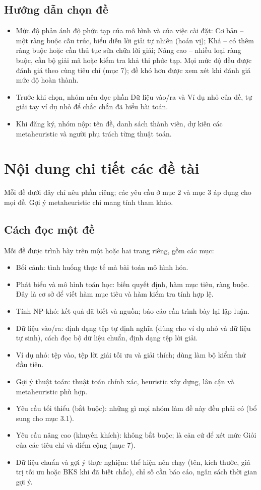 \documentclass[a4paper,11pt]{article}
\begin{document}
\subsection{Hướng dẫn chọn đề}
\begin{itemize}
\item Mức độ phản ánh độ phức tạp của mô hình và của việc cài đặt: Cơ bản – một ràng buộc cấu trúc, biểu diễn lời giải tự nhiên (hoán vị); Khá – có thêm ràng buộc hoặc cần thủ tục sửa chữa lời giải; Nâng cao – nhiều loại ràng buộc, cần bộ giải mã hoặc kiểm tra khả thi phức tạp. Mọi mức độ đều được đánh giá theo cùng tiêu chí (mục 7); đề khó hơn được xem xét khi đánh giá mức độ hoàn thành.
\item Trước khi chọn, nhóm nên đọc phần Dữ liệu vào/ra và Ví dụ nhỏ của đề, tự giải tay ví dụ nhỏ để chắc chắn đã hiểu bài toán.
\item Khi đăng ký, nhóm nộp: tên đề, danh sách thành viên, dự kiến các metaheuristic và người phụ trách từng thuật toán.
\end{itemize}
\section{Nội dung chi tiết các đề tài}
Mỗi đề dưới đây chỉ nêu phần riêng; các yêu cầu ở mục 2 và mục 3 áp dụng cho mọi đề. Gợi ý metaheuristic chỉ mang tính tham khảo.

\subsection{Cách đọc một đề}
Mỗi đề được trình bày trên một hoặc hai trang riêng, gồm các mục:

\begin{itemize}
\item Bối cảnh: tình huống thực tế mà bài toán mô hình hóa.
\item Phát biểu và mô hình toán học: biến quyết định, hàm mục tiêu, ràng buộc. Đây là cơ sở để viết hàm mục tiêu và hàm kiểm tra tính hợp lệ.
\item Tính NP-khó: kết quả đã biết và nguồn; báo cáo cần trình bày lại lập luận.
\item Dữ liệu vào/ra: định dạng tệp tự định nghĩa (dùng cho ví dụ nhỏ và dữ liệu tự sinh), cách đọc bộ dữ liệu chuẩn, định dạng tệp lời giải.
\item Ví dụ nhỏ: tệp vào, tệp lời giải tối ưu và giải thích; dùng làm bộ kiểm thử đầu tiên.
\item Gợi ý thuật toán: thuật toán chính xác, heuristic xây dựng, lân cận và metaheuristic phù hợp.
\item Yêu cầu tối thiểu (bắt buộc): những gì mọi nhóm làm đề này đều phải có (bổ sung cho mục 3.1).
\item Yêu cầu nâng cao (khuyến khích): không bắt buộc; là căn cứ để xét mức Giỏi của các tiêu chí và điểm cộng (mục 7).
\item Dữ liệu chuẩn và gợi ý thực nghiệm: thể hiện nên chạy (tên, kích thước, giá trị tối ưu hoặc BKS khi đã biết chắc), chỉ số cần báo cáo, ngân sách thời gian gợi ý.
\end{itemize}
\end{document}
